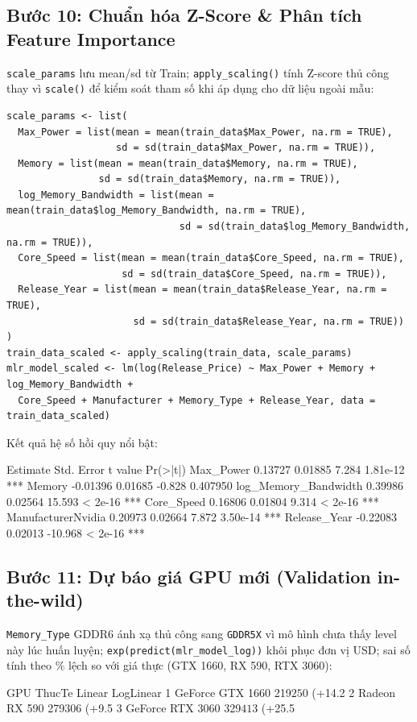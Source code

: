 \subsection{Bước 10: Chuẩn hóa Z-Score \& Phân tích Feature Importance}
\label{sec:buoc_10}
\texttt{scale\_params} lưu mean/sd từ Train; \texttt{apply\_scaling()} tính Z-score thủ công thay vì \texttt{scale()} để kiểm soát tham số khi áp dụng cho dữ liệu ngoài mẫu:
\begin{verbatim}
scale_params <- list(
  Max_Power = list(mean = mean(train_data$Max_Power, na.rm = TRUE),
                   sd = sd(train_data$Max_Power, na.rm = TRUE)),
  Memory = list(mean = mean(train_data$Memory, na.rm = TRUE),
                sd = sd(train_data$Memory, na.rm = TRUE)),
  log_Memory_Bandwidth = list(mean = mean(train_data$log_Memory_Bandwidth, na.rm = TRUE),
                              sd = sd(train_data$log_Memory_Bandwidth, na.rm = TRUE)),
  Core_Speed = list(mean = mean(train_data$Core_Speed, na.rm = TRUE),
                    sd = sd(train_data$Core_Speed, na.rm = TRUE)),
  Release_Year = list(mean = mean(train_data$Release_Year, na.rm = TRUE),
                      sd = sd(train_data$Release_Year, na.rm = TRUE))
)
train_data_scaled <- apply_scaling(train_data, scale_params)
mlr_model_scaled <- lm(log(Release_Price) ~ Max_Power + Memory + log_Memory_Bandwidth +
  Core_Speed + Manufacturer + Memory_Type + Release_Year, data = train_data_scaled)
\end{verbatim}
Kết quả hệ số hồi quy nổi bật:
\begin{rconsole}
                     Estimate Std. Error t value Pr(>|t|)    
Max_Power             0.13727    0.01885   7.284 1.81e-12 ***
Memory               -0.01396    0.01685  -0.828 0.407950    
log_Memory_Bandwidth  0.39986    0.02564  15.593  < 2e-16 ***
Core_Speed            0.16806    0.01804   9.314  < 2e-16 ***
ManufacturerNvidia    0.20973    0.02664   7.872 3.50e-14 ***
Release_Year         -0.22083    0.02013 -10.968  < 2e-16 ***
\end{rconsole}

\subsection{Bước 11: Dự báo giá GPU mới (Validation in-the-wild)}
\label{sec:buoc_11}
\texttt{Memory\_Type} GDDR6 ánh xạ thủ công sang \texttt{GDDR5X} vì mô hình chưa thấy level này lúc huấn luyện; \texttt{exp(predict(mlr\_model\_log))} khôi phục đơn vị USD; sai số tính theo \% lệch so với giá thực (GTX 1660, RX 590, RTX 3060):
\begin{rconsole}
               GPU ThucTe        Linear    LogLinear
1 GeForce GTX 1660   219$ 250$ (+14.2%
2    Radeon RX 590   279$  306$ (+9.5%
3 GeForce RTX 3060   329$ 413$ (+25.5%
\end{rconsole}

